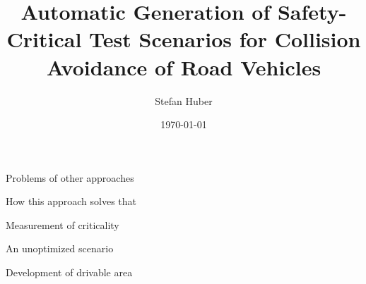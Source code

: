 \documentclass{beamer}
\title{Automatic Generation of Safety-Critical Test Scenarios for Collision Avoidance of Road Vehicles}
\author{Stefan Huber}
\institute{University of Passau}
\date{\today}
\begin{document}
\begin{frame}[plain]
    \noindent{}
\end{frame}

\maketitle

\begin{frame}{Problems of other approaches}
\end{frame}

\begin{frame}{How this approach solves that}
\end{frame}

\begin{frame}{Measurement of criticality}
\end{frame}

\begin{frame}{An unoptimized scenario}
\end{frame}

\begin{frame}{Development of drivable area}
\end{frame}
\end{document}
